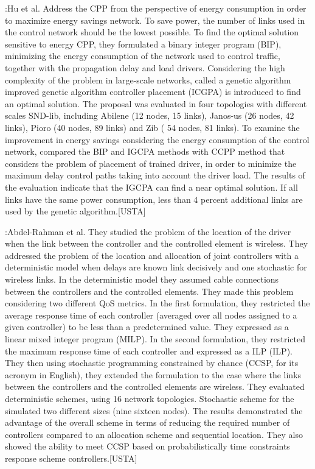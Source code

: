 \documentclass[a4paper,10pt]{article}
\begin{document}
\cite{HuLu17}:Hu et al. Address the CPP from the perspective of energy consumption in order to maximize energy savings network. To save power, the number of links used in the control network should be the lowest possible. To find the optimal solution sensitive to energy CPP, they formulated a binary integer program (BIP), minimizing the energy consumption of the network used to control traffic, together with the propagation delay and load drivers. Considering the high complexity of the problem in large-scale networks, called a genetic algorithm improved genetic algorithm controller placement (ICGPA) is introduced to find an optimal solution.
The proposal was evaluated in four topologies with different scales SND-lib, including Abilene (12 nodes, 15 links), Janos-us (26 nodes, 42 links), Pioro (40 nodes, 89 links) and Zib ( 54 nodes, 81 links). To examine the improvement in energy savings considering the energy consumption of the control network, compared the BIP and IGCPA methods with CCPP method that considers the problem of placement of trained driver, in order to minimize the maximum delay control paths taking into account the driver load. The results of the evaluation indicate that the IGCPA can find a near optimal solution. If all links have the same power consumption, less than 4 percent additional links are used by the genetic algorithm.[USTA]



\cite{AbMa17}:Abdel-Rahman et al. They studied the problem of the location of the driver when the link between the controller and the controlled element is wireless. They addressed the problem of the location and allocation of joint controllers with a deterministic model when delays are known link decisively and one stochastic for wireless links.
In the deterministic model they assumed cable connections between the controllers and the controlled elements. They made this problem considering two different QoS metrics. In the first formulation, they restricted the average response time of each controller (averaged over all nodes assigned to a given controller) to be less than a predetermined value. They expressed as a linear mixed integer program (MILP). In the second formulation, they restricted the maximum response time of each controller and expressed as a ILP (ILP). They then using stochastic programming constrained by chance (CCSP, for its acronym in English), they extended the formulation to the case where the links between the controllers and the controlled elements are wireless.
They evaluated deterministic schemes, using 16 network topologies. Stochastic scheme for the simulated two different sizes (nine sixteen nodes). The results demonstrated the advantage of the overall scheme in terms of reducing the required number of controllers compared to an allocation scheme and sequential location. They also showed the ability to meet CCSP based on probabilistically time constraints response scheme controllers.[USTA]
\end{document}
